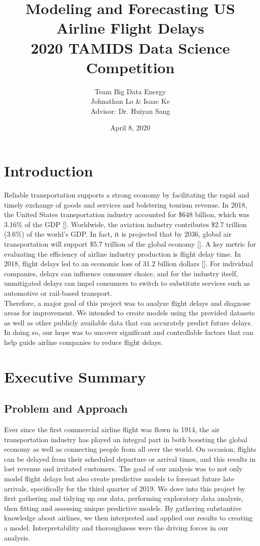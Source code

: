 \documentclass[12pt, a4paper, openany]{book}
\title{Modeling and Forecasting US Airline Flight Delays\\2020 TAMIDS Data Science Competition}
\author{Team Big Data Energy\\Johnathan Lo \& Isaac Ke\\Advisor: Dr. Huiyan Sang}
\date{April 8, 2020}
\newcommand\tab[1][1cm]{\hspace*{#1}}
\begin{document}
\maketitle
\tableofcontents

\chapter{Introduction}
\setcounter{page}{1}
\tab Reliable transportation supports a strong economy by facilitating the rapid and timely exchange of goods and services and bolstering tourism revenue. In 2018, the United States transportation industry accounted for \$648 billion, which was 3.16\% of the GDP [\cite{1}]. Worldwide, the aviation industry contributes \$2.7 trillion (3.6\%) of the world's GDP. In fact, it is projected that by 2036, global air transportation will support \$5.7 trillion of the global economy [\cite{2}]. A key metric for evaluating the efficiency of airline industry production is flight delay time. In 2018, flight delays led to an economic loss of 31.2 billion dollars [\cite{3}]. For individual companies, delays can influence consumer choice, and for the industry itself, unmitigated delays can impel consumers to switch to substitute services such as automotive or rail-based transport. \\
\tab Therefore, a major goal of this project was to analyze flight delays and diagnose areas for improvement. We intended to create models using the provided datasets as well as other publicly available data that can accurately predict future delays. In doing so, our hope was to uncover significant and controllable factors that can help guide airline companies to reduce flight delays. 
\chapter{Executive Summary}
	\section{Problem and Approach}
\tab Ever since the first commercial airline flight was flown in 1914, the air transportation industry has played an integral part in both boosting the global economy as well as connecting people from all over the world. On occasion, flights can be delayed from their scheduled departure or arrival times, and this results in lost revenue and irritated customers. The goal of our analysis was to not only model flight delays but also create predictive models to forecast future late arrivals, specifically for the third quarter of 2019. We dove into this project by first gathering and tidying up our data, performing exploratory data analysis, then fitting and assessing unique predictive models. By gathering substantive knowledge about airlines, we then interpreted and applied our results to creating a model.  Interpretability and thoroughness were the driving forces in our analysis.
\end{document}
